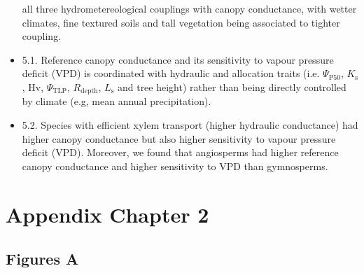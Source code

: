 \documentclass[11pt,twoside]{reedthesis}
\begin{document}
\begin{itemize}
  all three hydrometereological couplings with canopy conductance, with
  wetter climates, fine textured soils and tall vegetation being
  associated to tighter coupling.\par
\item
  5.1. Reference canopy conductance and its sensitivity to vapour
  pressure deficit (VPD) is coordinated with hydraulic and allocation
  traits (i.e. \(\Psi_{\text{P50}}\), \(K_{\text{s}}\), Hv,
  \(\Psi_{\text{TLP}}\), \(R_{\text{depth}}\), \(L_{\text{s}}\) and tree
  height) rather than being directly controlled by climate (e.g, mean
  annual precipitation).\par
\item
  5.2. Species with efficient xylem transport (higher hydraulic
  conductance) had higher canopy conductance but also higher sensitivity
  to vapour pressure deficit (VPD). Moreover, we found that angiosperms
  had higher reference canopy conductance and higher sensitivity to VPD
  than gymnosperms.\par
\end{itemize}
\appendix

\chapter{Appendix Chapter 2}\label{appendix-chapter-2}

\newpage

\section{Figures A}\label{figures-a}

\setlength{\abovecaptionskip}{0pt}
\end{document}
